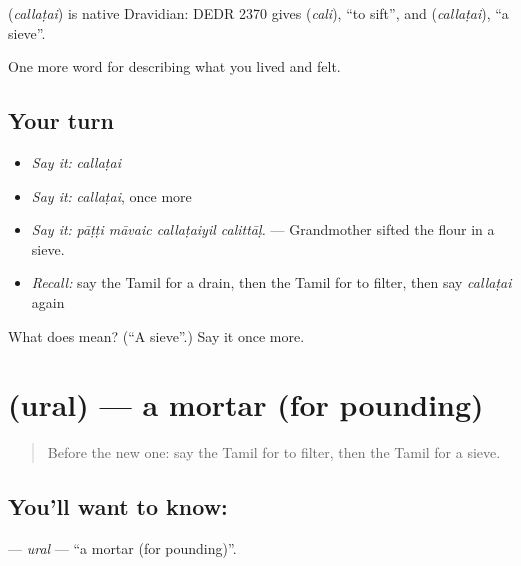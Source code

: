\begin{cousinweb}
\textbf{} (\emph{callaṭai}) is native Dravidian: DEDR 2370 gives  (\emph{cali}), \textquotedblleft{}to sift\textquotedblright{}, and  (\emph{callaṭai}), \textquotedblleft{}a sieve\textquotedblright{}.
\end{cousinweb}

\begin{grammarlens}[title={What you've built}]
One more word for describing what you lived and felt.
\end{grammarlens}

\subsection*{Your turn}
\begin{itemize}
\raggedright
  \item \emph{Say it:} \emph{callaṭai}
  \item \emph{Say it:} \emph{callaṭai}, once more
  \item \emph{Say it:} \emph{pāṭṭi māvaic callaṭaiyil calittāḷ.} — Grandmother sifted the flour in a sieve.
  \item \emph{Recall:} say the Tamil for a drain, then the Tamil for to filter, then say \emph{callaṭai} again
\end{itemize}

\begin{tcolorbox}[breakable,colback=teal!4,colframe=teal!35!black,title={Before you move on}]
What does  mean? (\textquotedblleft{}A sieve\textquotedblright{}.) Say it once more.
\end{tcolorbox}
\section[\texorpdfstring{\ta{உரல்} (ural)}{உரல் (ural)}]{ (ural) — a mortar (for pounding)}

\label{lesson:TA-C524-ural}



\begin{quote}
Before the new one: say the Tamil for to filter, then the Tamil for a sieve.
\end{quote}

\subsection*{You'll want to know: }
\textbf{} — \emph{ural} — \textquotedblleft{}a mortar (for pounding)\textquotedblright{}.

